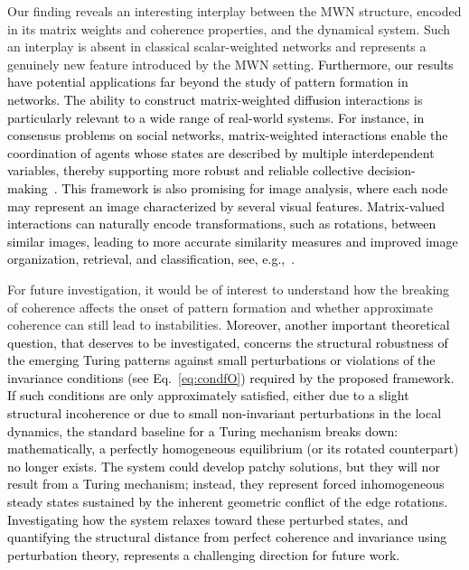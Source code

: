 \documentclass[aps,showpacs,preprintnumbers,amsmath,amssymb,twocolumn,superscriptaddress,floatfix,nofootinbib,10pt,pre]{revtex4-1}
\begin{document}
Our finding reveals an interesting interplay between the MWN structure, encoded in its matrix weights and coherence properties, and the dynamical system. Such an interplay is absent in classical scalar-weighted networks and represents a genuinely new feature introduced by the MWN setting. \textcolor{black}{Furthermore, our results have potential applications far beyond the study of pattern formation in networks. The ability to construct matrix-weighted diffusion interactions is particularly relevant to a wide range of real-world systems. For instance, in consensus problems on social networks, matrix-weighted interactions enable the coordination of agents whose states are described by multiple interdependent variables, thereby supporting more robust and reliable collective decision-making~\cite{tian2025matrix}. This framework is also promising for image analysis, where each node may represent an image characterized by several visual features. Matrix-valued interactions can naturally encode transformations, such as rotations, between similar images, leading to more accurate similarity measures and improved image organization, retrieval, and classification, see, e.g.,~\cite{pmlr-v196-barbero22a}.}   

For future investigation, it would be of interest to understand how the breaking of coherence affects the onset of pattern formation and whether approximate coherence can still lead to instabilities. \textcolor{black}{Moreover, another important theoretical question, that deserves to be investigated, concerns the structural robustness of the emerging Turing patterns against small perturbations or violations of the invariance conditions (see Eq.~\eqref{eq:condfO}) required by the proposed framework. 
If such conditions are only approximately satisfied, either due to a slight structural incoherence or due to small non-invariant perturbations in the local dynamics, the standard baseline for a Turing mechanism breaks down: mathematically, a perfectly homogeneous equilibrium (or its rotated counterpart) no longer exists. The system could develop patchy solutions, but they will nor result from a Turing mechanism; instead, they represent forced inhomogeneous steady states sustained by the inherent geometric conflict of the edge rotations. Investigating how the system relaxes toward these perturbed states, and quantifying the structural distance from perfect coherence and invariance using perturbation theory, represents a challenging direction for future work.}
\end{document}

